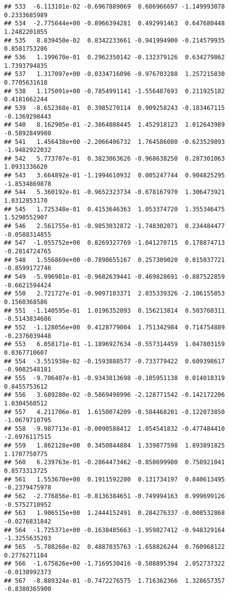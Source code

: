 \documentclass[
]{article}
\begin{document}
\begin{verbatim}
## 533  -6.113101e-02 -0.6967889069  0.606966697 -1.149993078  0.2333685989
## 534  -2.775644e+00 -0.8966394281  0.492991463  0.647680448  1.2482201055
## 535   8.839450e-02  0.8342233661 -0.941994900 -0.214579935  0.8581753286
## 536   1.199670e-01  0.2962350142 -0.132379126  0.634279862  1.7393794835
## 537   1.317097e+00 -0.0334716096 -0.976703288  1.257215830  0.7705631618
## 538   1.175091e+00 -0.7854991141 -1.556487693  0.211925182  0.4181662244
## 539  -8.652368e-01  0.3985270114  0.909258243 -0.183467115 -0.1369298443
## 540   8.162905e-01 -2.3864088445  1.452918123  1.012643989 -0.5892849980
## 541   1.456438e+00 -2.2066406732  1.764586080 -0.623529893 -1.9482922032
## 542   5.773707e-01  0.3823063626 -0.968638250  0.287301063  1.0931336620
## 543   3.664892e-01 -1.1994610932  0.005247744  0.904825295 -1.8534869878
## 544   5.360192e-01 -0.9652323734 -0.678167970  1.306473921  1.0312853170
## 545   1.725348e-01  0.4153646363  1.053374720  1.355346475  1.5290552907
## 546   2.561755e-01 -0.9853032872 -1.748302071  0.234484477 -0.0588314855
## 547  -1.055752e+00  0.8269327769 -1.041270715  0.178874713 -0.2814724765
## 548   1.556869e+00 -0.7898655167  0.257309020  0.015037721 -0.8599172746
## 549  -5.996981e-01 -0.9682639441 -0.469828691 -0.887522859 -0.6621594424
## 550   2.721727e-01 -0.9097103371  2.035339326 -2.106155853  0.1560368586
## 551  -1.140595e-01  1.0196352093  0.156213814  0.503760311 -0.5143834686
## 552  -1.128056e+00  0.4128779004  1.751342984  0.714754889 -0.2376039448
## 553   6.058171e-01 -1.1896927634 -0.557314459  1.047803159  0.0367710607
## 554  -3.551938e-02 -0.1593888577 -0.733779422  0.609398617 -0.9082548181
## 555  -9.706407e-01 -0.9343813698 -0.105951138  0.014018319  0.8455753612
## 556   3.689280e-02 -0.5869498996 -2.128771542 -0.142172206  1.0304560512
## 557   4.211706e-01  1.6150074209 -0.584468201 -0.122073850 -1.0679710795
## 558  -9.987713e-01 -0.0090588412  1.054541832 -0.477484410 -2.6976117515
## 559   1.862128e+00  0.3450844884  1.339877598  1.893891825  1.1707750775
## 560   6.239763e-01 -0.2864473462 -0.858699980  0.758921041  0.8573313725
## 561   1.553670e+00  0.1911592200  0.131734197  0.840613495 -0.2379475978
## 562  -2.776856e-01 -0.8136384651 -0.749994163  0.999699126 -0.5752710952
## 563   1.906515e+00  1.2444152491  0.284276337 -0.008532868 -0.0276831842
## 564  -1.725371e+00 -0.1638485663 -1.959827412 -0.948329164 -1.3255635203
## 565  -5.788268e-02  0.4887035763 -1.658826244  0.760968122  0.2776271184
## 566  -1.675826e+00 -1.7169530416 -0.508895394  2.052737322 -0.0138992373
## 567  -8.889324e-01 -0.7472276575  1.716362366  1.328657357 -0.8380365900

\end{verbatim}
\end{document}
